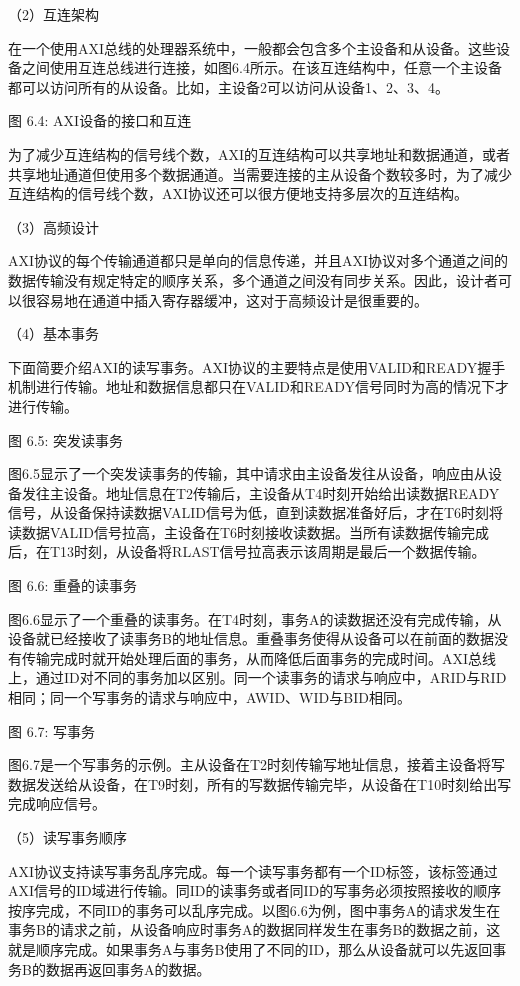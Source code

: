 \documentclass[]{ctexbook}
\begin{document}
（2）互连架构

在一个使用AXI总线的处理器系统中，一般都会包含多个主设备和从设备。这些设备之间使用互连总线进行连接，如图6.4所示。在该互连结构中，任意一个主设备都可以访问所有的从设备。比如，主设备2可以访问从设备1、2、3、4。

图 6.4: AXI设备的接口和互连

为了减少互连结构的信号线个数，AXI的互连结构可以共享地址和数据通道，或者共享地址通道但使用多个数据通道。当需要连接的主从设备个数较多时，为了减少互连结构的信号线个数，AXI协议还可以很方便地支持多层次的互连结构。

（3）高频设计

AXI协议的每个传输通道都只是单向的信息传递，并且AXI协议对多个通道之间的数据传输没有规定特定的顺序关系，多个通道之间没有同步关系。因此，设计者可以很容易地在通道中插入寄存器缓冲，这对于高频设计是很重要的。

（4）基本事务

下面简要介绍AXI的读写事务。AXI协议的主要特点是使用VALID和READY握手机制进行传输。地址和数据信息都只在VALID和READY信号同时为高的情况下才进行传输。

图 6.5: 突发读事务

图6.5显示了一个突发读事务的传输，其中请求由主设备发往从设备，响应由从设备发往主设备。地址信息在T2传输后，主设备从T4时刻开始给出读数据READY信号，从设备保持读数据VALID信号为低，直到读数据准备好后，才在T6时刻将读数据VALID信号拉高，主设备在T6时刻接收读数据。当所有读数据传输完成后，在T13时刻，从设备将RLAST信号拉高表示该周期是最后一个数据传输。

图 6.6: 重叠的读事务

图6.6显示了一个重叠的读事务。在T4时刻，事务A的读数据还没有完成传输，从设备就已经接收了读事务B的地址信息。重叠事务使得从设备可以在前面的数据没有传输完成时就开始处理后面的事务，从而降低后面事务的完成时间。AXI总线上，通过ID对不同的事务加以区别。同一个读事务的请求与响应中，ARID与RID相同；同一个写事务的请求与响应中，AWID、WID与BID相同。

图 6.7: 写事务

图6.7是一个写事务的示例。主从设备在T2时刻传输写地址信息，接着主设备将写数据发送给从设备，在T9时刻，所有的写数据传输完毕，从设备在T10时刻给出写完成响应信号。

（5）读写事务顺序

AXI协议支持读写事务乱序完成。每一个读写事务都有一个ID标签，该标签通过AXI信号的ID域进行传输。同ID的读事务或者同ID的写事务必须按照接收的顺序按序完成，不同ID的事务可以乱序完成。以图6.6为例，图中事务A的请求发生在事务B的请求之前，从设备响应时事务A的数据同样发生在事务B的数据之前，这就是顺序完成。如果事务A与事务B使用了不同的ID，那么从设备就可以先返回事务B的数据再返回事务A的数据。
\end{document}
